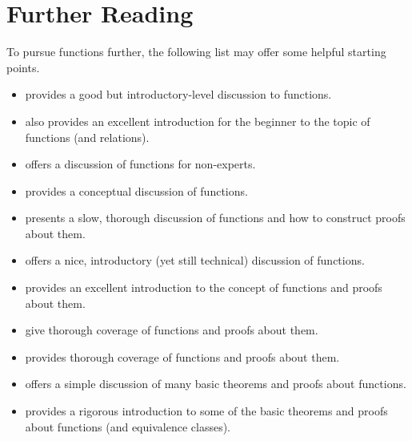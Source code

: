 \documentclass[../../../main.tex]{subfiles}
\begin{document}
\chapter{Further Reading}

To pursue functions further, the following list may offer some helpful starting points.

\begin{itemize}

  \item \citet[ch.~5]{StewartAndTall2015} provides a good but introductory-level discussion to functions.
  
  \item \citet[ch.~2]{Steinhart2018} also provides an excellent introduction for the beginner to the topic of functions (and relations).
  
  \item \citet[ch.~5]{Stewart1995} offers a discussion of functions for non-experts.
  
  \item \citet[ch.~15]{Flegg1974} provides a conceptual discussion of functions.
  
  \item \citet[ch.~8]{Cummings2020} presents a slow, thorough discussion of functions and how to construct proofs about them.
  
  \item \citet[ch.~3]{Zach2019} offers a nice, introductory (yet still technical) discussion of functions.

  \item \citet[ch.~5]{Velleman2019} provides an excellent introduction to the concept of functions and proofs about them.

  \item \citet[chs.~11--12]{MaddenAndAubrey2017} give thorough coverage of functions and proofs about them.

  \item \citet[ch.~4]{Warner2019} provides thorough coverage of functions and proofs about them.

  \item \citet[ch.~2]{Pinter2014} offers a simple discussion of many basic theorems and proofs about functions.

  \item \citet[ch.~6]{Jongsma2019} provides a rigorous introduction to some of the basic theorems and proofs about functions (and equivalence classes).
  
\end{itemize}
\end{document}
